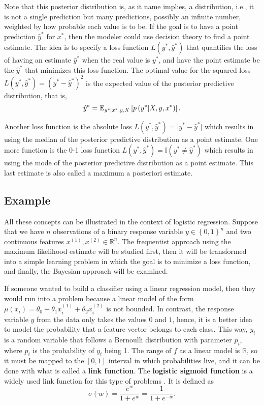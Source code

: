 Note that this posterior distribution is, as it name implies, a distribution, i.e., it is not a single prediction but many predictions, possibly an infinite number, weighted by how probable each value is to be. If the goal is to have a point prediction $\hat{y}^*$ for $x^*$, then the modeler could use decision theory to find a point estimate. The idea is to specify a loss function $L(y^*, \hat{y}^*)$ that quantifies the loss of having an estimate $\hat{y}^*$ when the real value is $y^*$, and have the point estimate be the $\hat{y}^*$ that minimizes this loss function. The optimal value for the squared loss $L(y^*, \hat{y}^*) = (y^* - \hat{y}^*)^2$ is the expected value of the posterior predictive distribution, that is,
\begin{equation}
  \hat{y}^* = \mathbb{E}_{y^* | x^*, y, X} \left[ p\left( y^* | X, y, x^* \right) \right].
\end{equation}

Another loss function is the absolute loss $L(y^*, \hat{y}^*) = \vert y^* - \hat{y}^* \vert$ which results in using the median of the posterior predictive distribution as a point estimate. One more function is the 0-1 loss function $L(y^*, \hat{y}^*) = \mathbb{I}(y^* \neq \hat{y}^* )$ which results in using the mode of the posterior predictive distribution as a point estimate. This last estimate is also called a maximum a posteriori estimate.

\subsection{Example}

All these concepts can be illustrated in the context of logistic regression. Suppose that we have $n$ observations of a binary response variable $y \in \left\{0, 1\right\}^n$ and two continuous features $x^{(1)}, x^{(2)} \in \mathbb{R}^n$. The frequentist approach using the maximum likelihood estimate will be studied first, then it will be transformed into a simple learning problem in which the goal is to minimize a loss function, and finally, the Bayesian approach will be examined.

If someone wanted to build a classifier using a linear regression model, then they would run into a problem because a linear model of the form $\mu(x_i) = \theta_0 + \theta_1 x_i^{(1)} + \theta_2 x_i^{(2)}$ is not bounded. In contrast, the response variable $y$ from the data only takes the values $0$ and $1$, hence, it is a better idea to model the probability that a feature vector belongs to each class. This way, $y_i$ is a random variable that follows a Bernoulli distribution with parameter $p_i$, where $p_i$ is the probability of $y_i$ being 1.
The range of $f$ as a linear model is $\mathbb{R}$, so it must be mapped to the $\left[ 0,1 \right]$ interval in which probabilities live, and it can be done with what is called a \textbf{link function}. The \textbf{logistic sigmoid function} %
is a widely used link function for this type of problems \cite[p.~114]{christopher2006pattern}. It is defined as
\begin{equation}
  \sigma(w) = \frac{e^w}{1 + e^w} = \frac{1}{1 + e^{-w}}.
\end{equation}

